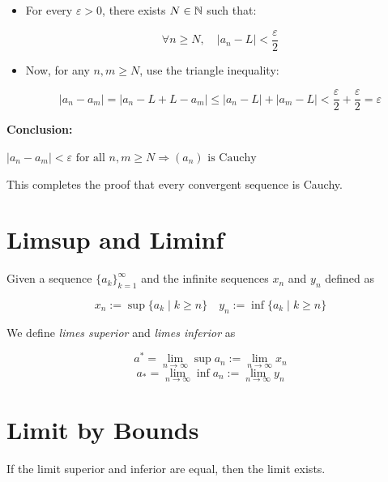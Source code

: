 \begin{itemize}

    \item For every \( \varepsilon > 0 \), there exists \( N \in \mathbb{N} \) such that:

    \[
        \forall n \ge N, \quad |a_n - L| < \frac{\varepsilon}{2}
    \]

    \item Now, for any \( n, m \ge N \), use the triangle inequality:

    \[
        |a_n - a_m| = |a_n - L + L - a_m| \le |a_n - L| + |a_m - L| < \frac{\varepsilon}{2} + \frac{\varepsilon}{2} = \varepsilon
    \]

\end{itemize}

\textbf{Conclusion:}  

\(|a_n - a_m| < \varepsilon \text{ for all } n, m \ge N \Rightarrow (a_n) \text{ is Cauchy}\)

This completes the proof that every convergent sequence is Cauchy.

\QED

\section{Limsup and Liminf}

Given a sequence \(\{a_k\}_{k = 1}^{\infty}\) and the infinite sequences \(x_n\) and \(y_n\) defined as 

\[
    x_n := \sup \{a_k \mid k \ge n\} \quad y_n := \inf \{a_k \mid k \ge n\}
\]

We define \emph{limes superior} and \emph{limes inferior} as 

\[
    a^* = \lim_{n \to \infty} \sup a_n := \lim_{n \to \infty} x_n 
\]
\[
    a_* = \lim_{n \to \infty} \inf a_n := \lim_{n \to \infty} y_n 
\]

\section{Limit by Bounds}

If the limit superior and inferior are equal, then the limit exists.